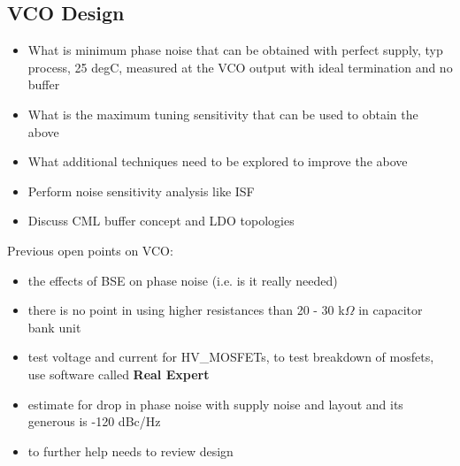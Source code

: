 
\subsection{VCO Design}

\begin{itemize}

	\item What is minimum phase noise that can be obtained with perfect supply, typ process, 25 degC, measured at the VCO output with ideal termination and no buffer
	\item What is the maximum  tuning sensitivity that can be used to obtain the above
	\item What additional techniques need to be explored to improve the above
	\item Perform noise sensitivity analysis like ISF
	\item Discuss CML buffer concept and LDO topologies %
	
\end{itemize}

Previous open points on VCO:

\begin{itemize}
	\item the effects of BSE on phase noise (i.e. is it really needed)
	\item there is no point in using higher resistances than 20 - 30 k$\Omega$ in capacitor bank unit
	\item test voltage and current for HV\_MOSFETs, to test breakdown of mosfets, use software called \textbf{Real Expert} 
	\item estimate for drop in phase noise with supply noise and layout and its generous is -120 dBc/Hz %
	\item to further help needs to review design
\end{itemize}





